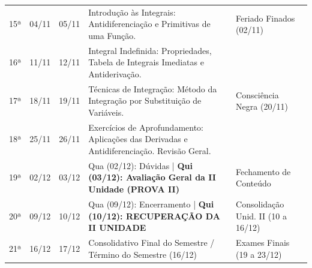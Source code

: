 \documentclass[12pt,a4paper]{article}
\begin{document}
\begin{longtable}{p{0.8cm} p{1.8cm} p{1.8cm} p{7.7cm} p{4.3cm}}
15ª & 04/11 & 05/11 & Introdução às Integrais: Antidiferenciação e Primitivas de uma Função. & Feriado Finados (02/11) \\
\rowcolor{lightgrey}
16ª & 11/11 & 12/11 & Integral Indefinida: Propriedades, Tabela de Integrais Imediatas e Antiderivação. & \\
17ª & 18/11 & 19/11 & Técnicas de Integração: Método da Integração por Substituição de Variáveis. & Consciência Negra (20/11) \\
\rowcolor{lightgrey}
18ª & 25/11 & 26/11 & Exercícios de Aprofundamento: Aplicações das Derivadas e Antidiferenciação. Revisão Geral. & \\
19ª & 02/12 & 03/12 & Qua (02/12): Dúvidas | \textbf{Qui (03/12): Avaliação Geral da II Unidade (PROVA II)} & Fechamento de Conteúdo \\
\rowcolor{lightgrey}
20ª & 09/12 & 10/12 & Qua (09/12): Encerramento | \textbf{Qui (10/12): RECUPERAÇÃO DA II UNIDADE} & Consolidação Unid. II (10 a 16/12) \\
21ª & 16/12 & 17/12 & Consolidativo Final do Semestre / Término do Semestre (16/12) & Exames Finais (19 a 23/12) \\

\end{longtable}
\end{document}
